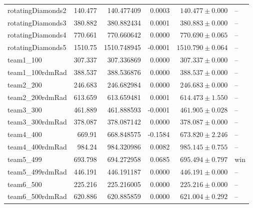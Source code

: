 \documentclass[11pt]{article}
\begin{document}
\begin{longtable}{lrrrrl}
rotatingDiamonds2 & 140.477 & 140.477409 & 0.0003 & $140.477 \pm 0.000$ & -- \\
rotatingDiamonds3 & 380.882 & 380.882434 & 0.0001 & $380.883 \pm 0.000$ & -- \\
rotatingDiamonds4 & 770.661 & 770.660642 & 0.0000 & $770.690 \pm 0.065$ & -- \\
rotatingDiamonds5 & 1510.75 & 1510.748945 & -0.0001 & $1510.790 \pm 0.064$ & -- \\
team1\_100 & 307.337 & 307.336869 & 0.0000 & $307.337 \pm 0.000$ & -- \\
team1\_100rdmRad & 388.537 & 388.536876 & 0.0000 & $388.537 \pm 0.000$ & -- \\
team2\_200 & 246.683 & 246.682984 & 0.0000 & $246.683 \pm 0.000$ & -- \\
team2\_200rdmRad & 613.659 & 613.659481 & 0.0001 & $614.473 \pm 1.550$ & -- \\
team3\_300 & 461.889 & 461.888593 & -0.0001 & $461.905 \pm 0.028$ & -- \\
team3\_300rdmRad & 378.087 & 378.087142 & 0.0000 & $378.087 \pm 0.000$ & -- \\
team4\_400 & 669.91 & 668.848575 & -0.1584 & $673.820 \pm 2.246$ & -- \\
team4\_400rdmRad & 984.24 & 984.320986 & 0.0082 & $985.145 \pm 0.755$ & -- \\
team5\_499 & 693.798 & 694.272958 & 0.0685 & $695.494 \pm 0.797$ & win \\
team5\_499rdmRad & 446.191 & 446.191187 & 0.0000 & $446.191 \pm 0.000$ & -- \\
team6\_500 & 225.216 & 225.216005 & 0.0000 & $225.216 \pm 0.000$ & -- \\
team6\_500rdmRad & 620.886 & 620.885859 & 0.0000 & $621.004 \pm 0.292$ & -- \\
\end{longtable}
\endgroup
\end{document}
